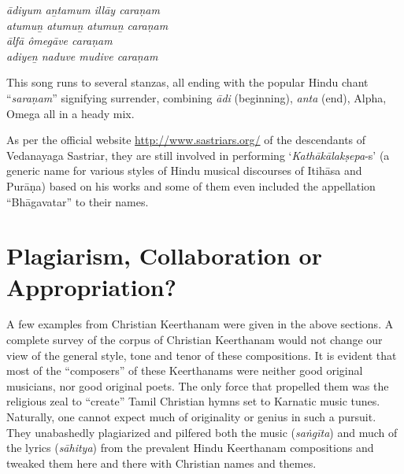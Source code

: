 \begin{myquote}
\textit{ādiyum aṉtamum illāy caraṇam\\ atumuṉ atumuṉ atumuṉ caraṇam\\ ālfā ômegāve caraṇam\\ adiyeṉ naduve mudive caraṇam}
\end{myquote}

\begin{myquote}
\end{myquote}

This song runs to several stanzas, all ending with the popular Hindu chant “\textit{saraṇam}” signifying surrender, combining \textit{ādi} (beginning), \textit{anta} (end), Alpha, Omega all in a heady mix.

As per the official website \url{http://www.sastriars.org/} of the descendants of Vedanayaga Sastriar, they are still involved in performing ‘\textit{Kathākālakṣepa}-s’ (a generic name for various styles of Hindu musical discourses of Itihāsa and Purāṇa) based on his works and some of them even included the appellation “Bhāgavatar” to their names.


\section*{Plagiarism, Collaboration or Appropriation?}

A few examples from Christian Keerthanam were given in the above sections. A complete survey of the corpus of Christian Keerthanam would not change our view of the general style, tone and tenor of these compositions. It is evident that most of the “composers” of these Keerthanams were neither good original musicians, nor good original poets. The only force that propelled them was the religious zeal to “create” Tamil Christian hymns set to Karnatic music tunes. Naturally, one cannot expect much of originality or genius in such a pursuit. They unabashedly plagiarized and pilfered both the music (\textit{saṅgīta}) and much of the lyrics (\textit{sāhitya}) from the prevalent Hindu Keerthanam compositions and tweaked them here and there with Christian names and themes.

